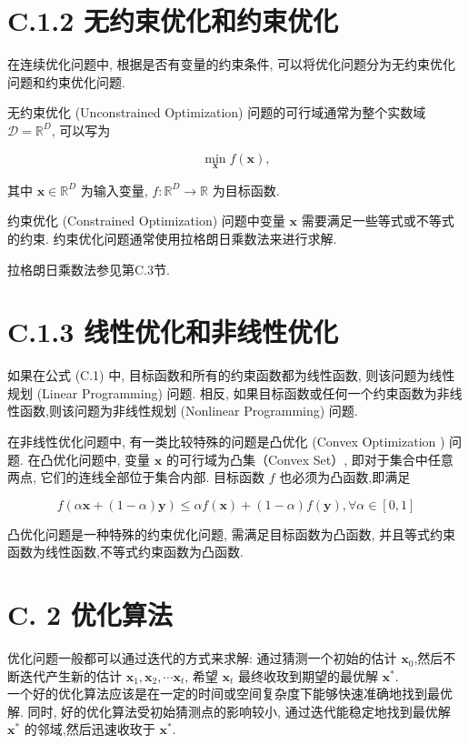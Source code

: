 \documentclass[10pt]{article}
\begin{document}
\section*{C.1.2 无约束优化和约束优化}
在连续优化问题中, 根据是否有变量的约束条件, 可以将优化问题分为无约束优化问题和约束优化问题.

无约束优化 (Unconstrained Optimization) 问题的可行域通常为整个实数域 $\mathcal{D}=\mathbb{R}^{D}$, 可以写为


\begin{equation*}
\min _{\boldsymbol{x}} f(\boldsymbol{x}), \tag{C.1}
\end{equation*}


其中 $\boldsymbol{x} \in \mathbb{R}^{D}$ 为输入变量, $f: \mathbb{R}^{D} \rightarrow \mathbb{R}$ 为目标函数.

约束优化 (Constrained Optimization) 问题中变量 $\boldsymbol{x}$ 需要满足一些等式或不等式的约束. 约束优化问题通常使用拉格朗日乘数法来进行求解.

拉格朗日乘数法参见第C.3节.

\section*{C.1.3 线性优化和非线性优化}
如果在公式 (C.1) 中, 目标函数和所有的约束函数都为线性函数, 则该问题为线性规划 (Linear Programming) 问题. 相反, 如果目标函数或任何一个约束函数为非线性函数,则该问题为非线性规划 (Nonlinear Programming) 问题.

在非线性优化问题中, 有一类比较特殊的问题是凸优化 (Convex Optimization ) 问题. 在凸优化问题中, 变量 $\boldsymbol{x}$ 的可行域为凸集（Convex Set）, 即对于集合中任意两点, 它们的连线全部位于集合内部. 目标函数 $f$ 也必须为凸函数,即满足


\begin{equation*}
f(\alpha \boldsymbol{x}+(1-\alpha) \boldsymbol{y}) \leq \alpha f(\boldsymbol{x})+(1-\alpha) f(\boldsymbol{y}), \forall \alpha \in[0,1] \tag{C.2}
\end{equation*}


凸优化问题是一种特殊的约束优化问题, 需满足目标函数为凸函数, 并且等式约束函数为线性函数,不等式约束函数为凸函数.

\section*{C. 2 优化算法}
优化问题一般都可以通过迭代的方式来求解: 通过猜测一个初始的估计 $\boldsymbol{x}_{0}$,然后不断迭代产生新的估计 $\boldsymbol{x}_{1}, \boldsymbol{x}_{2}, \cdots \boldsymbol{x}_{t}$, 希望 $\boldsymbol{x}_{t}$ 最终收玫到期望的最优解 $\boldsymbol{x}^{*}$.\\
一个好的优化算法应该是在一定的时间或空间复杂度下能够快速准确地找到最优解. 同时, 好的优化算法受初始猜测点的影响较小, 通过迭代能稳定地找到最优解 $\boldsymbol{x}^{*}$ 的邻域,然后迅速收玫于 $\boldsymbol{x}^{*}$.
\end{document}
